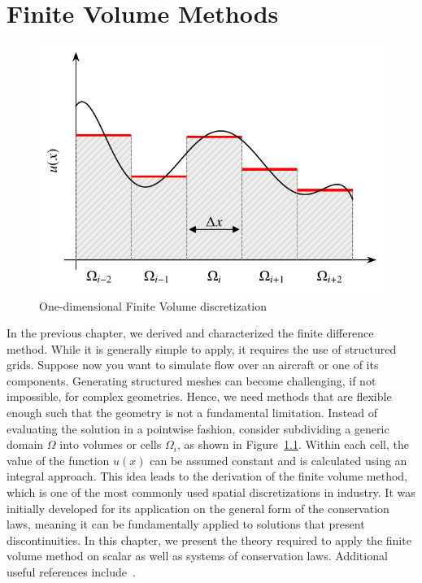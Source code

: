 \chapter{Finite Volume Methods}
\begin{figure}[htbp]
 \centering
 \includegraphics[width=0.6\linewidth]{Pictures/fv_scheme}
 \caption{One-dimensional Finite Volume discretization}
 \label{fig:fv_scheme}
\end{figure}
In the previous chapter, we derived and characterized the finite difference method. While it is generally simple to apply, it requires the use of structured grids. Suppose now you want to simulate flow over an aircraft or one of its components. Generating structured meshes can become challenging, if not impossible, for complex geometries. Hence, we need methods that are flexible enough such that the geometry is not a fundamental limitation. Instead of evaluating the solution in a pointwise fashion, consider subdividing a generic domain $\Omega$ into volumes or cells $\Omega_i$, as shown in Figure~\ref{fig:fv_scheme}. Within each cell, the value of the function $u(x)$ can be assumed constant and is calculated using an integral approach. This idea leads to the derivation of the finite volume method, which is one of the most commonly used spatial discretizations in industry. It was initially developed for its application on the general form of the conservation laws, meaning it can be fundamentally applied to solutions that present discontinuities. In this chapter, we present the theory required to apply the finite volume method on scalar as well as systems of conservation laws. Additional useful references include~\cite{levequeFiniteVolumeMethods2002,hirschNumericalComputationInternal2007a,andersonComputationalFluidMechanics2016, toroRiemannSolversEvolved2006}.

